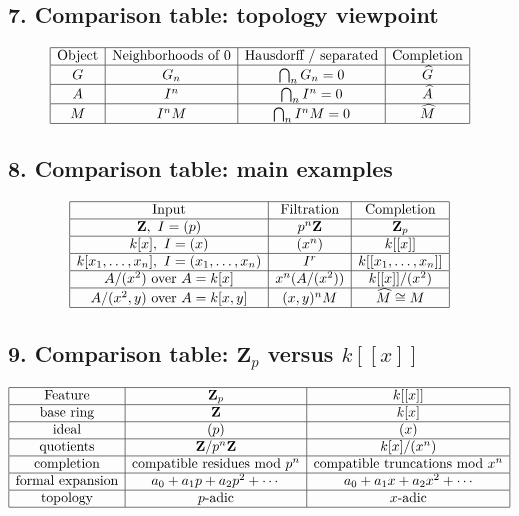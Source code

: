 \documentclass[12pt,a4paper]{article}
\theoremstyle{plain}
\theoremstyle{definition}      %
\begin{document}
\subsection*{7. Comparison table: topology viewpoint}

\[
\begin{array}{|c|c|c|c|}
	\hline
	\text{Object} & \text{Neighborhoods of }0 & \text{Hausdorff / separated} & \text{Completion} \\
	\hline
	G & G_n & \bigcap_n G_n=0 & \widehat G \\
	\hline
	A & I^n & \bigcap_n I^n=0 & \widehat A \\
	\hline
	M & I^nM & \bigcap_n I^nM=0 & \widehat M \\
	\hline
\end{array}
\]

\subsection*{8. Comparison table: main examples}

\[
\begin{array}{|c|c|c|}
	\hline
	\text{Input} & \text{Filtration} & \text{Completion} \\
	\hline
	\mathbf Z,\ I=(p) & p^n\mathbf Z & \mathbf Z_p \\
	\hline
	k[x],\ I=(x) & (x^n) & k[[x]] \\
	\hline
	k[x_1,\dots,x_n],\ I=(x_1,\dots,x_n) & I^r & k[[x_1,\dots,x_n]] \\
	\hline
	A/(x^2)\text{ over }A=k[x] & x^n(A/(x^2)) & k[[x]]/(x^2) \\
	\hline
	A/(x^2,y)\text{ over }A=k[x,y] & (x,y)^nM & \widehat M\cong M \\
	\hline
\end{array}
\]

\subsection*{9. Comparison table: \(\mathbf Z_p\) versus \(k[[x]]\)}

\[
\begin{array}{|c|c|c|}
	\hline
	\text{Feature} & \mathbf Z_p & k[[x]] \\
	\hline
	\text{base ring} & \mathbf Z & k[x] \\
	\hline
	\text{ideal} & (p) & (x) \\
	\hline
	\text{quotients} & \mathbf Z/p^n\mathbf Z & k[x]/(x^n) \\
	\hline
	\text{completion} & \text{compatible residues mod }p^n & \text{compatible truncations mod }x^n \\
	\hline
	\text{formal expansion} & a_0+a_1p+a_2p^2+\cdots & a_0+a_1x+a_2x^2+\cdots \\
	\hline
	\text{topology} & p\text{-adic} & x\text{-adic} \\
	\hline
\end{array}
\]
\end{document}
